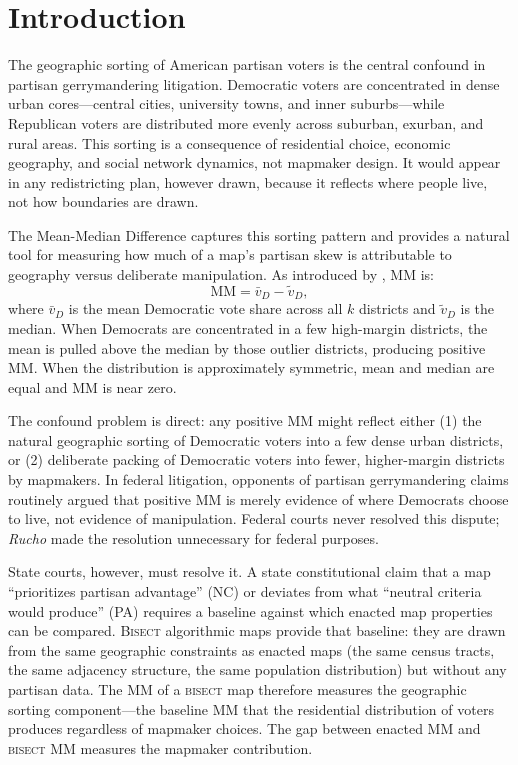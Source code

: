 \section{Introduction}
\label{sec:introduction}

The geographic sorting of American partisan voters is the central confound in
partisan gerrymandering litigation. Democratic voters are concentrated in dense
urban cores---central cities, university towns, and inner suburbs---while Republican
voters are distributed more evenly across suburban, exurban, and rural areas.
This sorting is a consequence of residential choice, economic geography, and
social network dynamics, not mapmaker design. It would appear in any redistricting
plan, however drawn, because it reflects where people live, not how boundaries
are drawn.

The Mean-Median Difference captures this sorting pattern and provides a natural
tool for measuring how much of a map's partisan skew is attributable to geography
versus deliberate manipulation. As introduced by \citet{wang2016}, MM is:
\[
\text{MM} = \bar{v}_D - \tilde{v}_D,
\]
where $\bar{v}_D$ is the mean Democratic vote share across all $k$ districts
and $\tilde{v}_D$ is the median. When Democrats are concentrated in a few
high-margin districts, the mean is pulled above the median by those outlier
districts, producing positive MM. When the distribution is approximately symmetric,
mean and median are equal and MM is near zero.

The confound problem is direct: any positive MM might reflect either (1) the
natural geographic sorting of Democratic voters into a few dense urban districts,
or (2) deliberate packing of Democratic voters into fewer, higher-margin districts
by mapmakers. In federal litigation, opponents of partisan gerrymandering claims
routinely argued that positive MM is merely evidence of where Democrats choose to
live, not evidence of manipulation. Federal courts never resolved this dispute;
\textit{Rucho} made the resolution unnecessary for federal purposes.

State courts, however, must resolve it. A state constitutional claim that a map
``prioritizes partisan advantage'' (NC) or deviates from what ``neutral criteria
would produce'' (PA) requires a baseline against which enacted map properties
can be compared. \textsc{Bisect} algorithmic maps provide that baseline: they
are drawn from the same geographic constraints as enacted maps (the same census
tracts, the same adjacency structure, the same population distribution) but
without any partisan data. The MM of a \textsc{bisect} map therefore measures
the geographic sorting component---the baseline MM that the residential distribution
of voters produces regardless of mapmaker choices. The gap between enacted MM
and \textsc{bisect} MM measures the mapmaker contribution.

